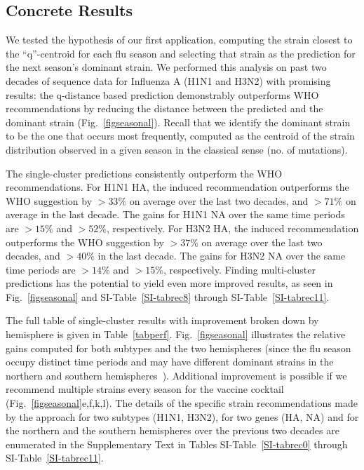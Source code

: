 \documentclass[onecolumn, compsoc,10pt]{IEEEtran}
\begin{document}
\subsection*{Concrete Results} 

We tested the hypothesis of our first application, computing the strain closest to the ``q''-centroid for each flu season and selecting that strain as the prediction for the next season's dominant strain. We performed this analysis on past two decades of sequence data for Influenza A (H1N1 and H3N2) with promising results: the q-distance based prediction demonstrably outperforms WHO recommendations by reducing  the  distance between the predicted and  the dominant  strain (Fig.~\ref{figseasonal}). Recall that we identify the dominant strain to be the one that occurs most frequently, computed as the centroid of the strain distribution observed in a given season in the classical sense (no. of mutations).

The \qnet single-cluster predictions consistently outperform the WHO recommendations. For H1N1 HA, the \qnet induced recommendation outperforms the WHO suggestion by $>33\%$ on average over the last two decades, and $>71\%$ on average in the last decade. The gains for H1N1 NA over the same time periods are $>15\%$ and $>52\%$, respectively. For H3N2 HA, the \qnet induced recommendation outperforms the WHO suggestion by $>37\%$ on average over the last two decades, and $>40\%$ in the last decade. The gains for H3N2 NA over the same time periods are $>14\%$ and $>15\%$, respectively. Finding multi-cluster predictions has the potential to yield even more improved results, as seen in Fig.~\ref{figseasonal} and SI-Table~\ref{SI-tabrec8} through SI-Table~\ref{SI-tabrec11}.

The full table of single-cluster results with improvement broken down by hemisphere is given in Table~\ref{tabperf}. Fig.~\ref{figseasonal} illustrates the relative gains computed for both subtypes and the two hemispheres (since the flu season occupy distinct time periods and may have different dominant strains in the northern and southern hemispheres~\cite{boni2008vaccination}). Additional improvement is possible if we recommend multiple strains every season for the vaccine cocktail (Fig.~\ref{figseasonal}e,f,k,l). The details of the specific strain  recommendations made by the \qnet approach for two subtypes (H1N1, H3N2), for two genes (HA, NA) and for the northern and the southern hemispheres over the previous two decades are enumerated in the Supplementary Text in Tables SI-Table~\ref{SI-tabrec0} through SI-Table~\ref{SI-tabrec11}.
\end{document}
